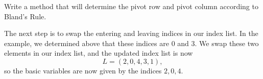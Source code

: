 \begin{problem}
Write a method that will determine the pivot row and pivot column according to Bland's Rule.

\label{prob:blands}
\end{problem}

The next step is to swap the entering and leaving indices in our index list.
In the example, we determined above that these indices are $0$ and $3$. We swap these two elements in our index list,
and the updated index list is now
\[
L = (2, 0, 4, 3, 1),
\]
so the basic variables are now given by the indices $2, 0, 4$.

